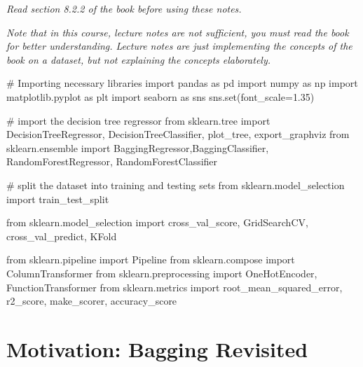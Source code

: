 \documentclass[
  letterpaper,
  DIV=11,
  numbers=noendperiod]{scrreprt}
\newenvironment{Shaded}{\begin{snugshade}}{\end{snugshade}}
\newcommand{\BuiltInTok}[1]{\textcolor[rgb]{0.00,0.23,0.31}{#1}}
\newcommand{\CommentTok}[1]{\textcolor[rgb]{0.37,0.37,0.37}{#1}}
\newcommand{\FloatTok}[1]{\textcolor[rgb]{0.68,0.00,0.00}{#1}}
\newcommand{\ImportTok}[1]{\textcolor[rgb]{0.00,0.46,0.62}{#1}}
\newcommand{\NormalTok}[1]{\textcolor[rgb]{0.00,0.23,0.31}{#1}}
\newcommand{\OperatorTok}[1]{\textcolor[rgb]{0.37,0.37,0.37}{#1}}
\begin{document}
\emph{Read section 8.2.2 of the book before using these notes.}

\emph{Note that in this course, lecture notes are not sufficient, you
must read the book for better understanding. Lecture notes are just
implementing the concepts of the book on a dataset, but not explaining
the concepts elaborately.}

\begin{Shaded}
\begin{Highlighting}[]
\CommentTok{\# Importing necessary libraries}
\ImportTok{import}\NormalTok{ pandas }\ImportTok{as}\NormalTok{ pd}
\ImportTok{import}\NormalTok{ numpy }\ImportTok{as}\NormalTok{ np}
\ImportTok{import}\NormalTok{ matplotlib.pyplot }\ImportTok{as}\NormalTok{ plt}
\ImportTok{import}\NormalTok{ seaborn }\ImportTok{as}\NormalTok{ sns}
\NormalTok{sns.}\BuiltInTok{set}\NormalTok{(font\_scale}\OperatorTok{=}\FloatTok{1.35}\NormalTok{)}

\CommentTok{\# import the decision tree regressor}
\ImportTok{from}\NormalTok{ sklearn.tree }\ImportTok{import}\NormalTok{ DecisionTreeRegressor, DecisionTreeClassifier, plot\_tree, export\_graphviz}
\ImportTok{from}\NormalTok{ sklearn.ensemble }\ImportTok{import}\NormalTok{ BaggingRegressor,BaggingClassifier, RandomForestRegressor, RandomForestClassifier}

\CommentTok{\# split the dataset into training and testing sets}
\ImportTok{from}\NormalTok{ sklearn.model\_selection }\ImportTok{import}\NormalTok{ train\_test\_split}


\ImportTok{from}\NormalTok{ sklearn.model\_selection }\ImportTok{import}\NormalTok{ cross\_val\_score, GridSearchCV, cross\_val\_predict, KFold}

\ImportTok{from}\NormalTok{ sklearn.pipeline }\ImportTok{import}\NormalTok{ Pipeline}
\ImportTok{from}\NormalTok{ sklearn.compose }\ImportTok{import}\NormalTok{ ColumnTransformer}
\ImportTok{from}\NormalTok{ sklearn.preprocessing }\ImportTok{import}\NormalTok{ OneHotEncoder, FunctionTransformer}
\ImportTok{from}\NormalTok{ sklearn.metrics }\ImportTok{import}\NormalTok{ root\_mean\_squared\_error, r2\_score, make\_scorer, accuracy\_score}
\end{Highlighting}
\end{Shaded}

\section{Motivation: Bagging
Revisited}\label{motivation-bagging-revisited}
\end{document}
